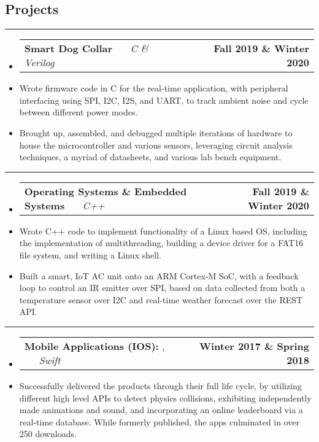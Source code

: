 \documentclass[10pt,letterpaper]{article}
\makeatletter
\newcommand{\header}[2]
{
	\begin{tabular*}{\linewidth}{l @{\extracolsep{\fill}} r}
		\hspace{-27pt} #1 & #2 \\
	\end{tabular*}
}
\newcommand{\sectionbreak}
{
	\vspace{-1.2em}
	\rule{\textwidth}{1.7pt}
	\vspace{-1.7em}
}
\makeatother
\begin{document}
\vspace{-1.5em}

\subsection*{Projects}
\sectionbreak


\begin{itemize}
	\item[]
		\header
		{
			\textbf{Smart Dog Collar}
			\emph{\smash{Senior Design Project}} \ \ \ \footnotesize \emph{C \& Verilog}
		}
		{\textbf{Fall 2019 \& Winter 2020}}
	\item 
		Wrote firmware code in C for the real-time application, with peripheral interfacing using SPI, I2C, I2S, and UART, to track ambient noise and cycle between different power modes.
	\item 
		Brought up, assembled, and debugged multiple iterations of hardware to house the microcontroller and various sensors, leveraging circuit analysis techniques, a myriad of datasheets, and various lab bench equipment.

\end{itemize}

\hrule

\begin{itemize}
	\item[]
		\header
		{
			\textbf{Operating Systems \& Embedded Systems}
			\emph{\smash{Relevant Course Project}} \ \ \ \footnotesize \emph{C++}
		}
		{\textbf{Fall 2019 \& Winter 2020}}
	\item 
		Wrote C++ code to implement functionality of a Linux based OS, including the implementation of multithreading, building a device driver for a FAT16 file system, and writing a Linux shell.
	\item 
		Built a smart, IoT AC unit onto an ARM Cortex-M SoC, with a feedback loop to control an IR emitter over SPI, based on data collected from both a temperature sensor over I2C and real-time weather forecast over the REST API. 

\end{itemize}

\hrule

\begin{itemize}
	\item[]
		\header
		{
			\textbf{Mobile Applications (IOS): }
			\href{https://appadvice.com/app/round-bound/1369632746}{\emph{\underline{\smash{Round 'a Bound}}}}, 
			\href{https://appadvice.com/app/tic-tac-emoji/1346934986}{\emph{\underline{\smash{Tic-Tac Emoji}}}} \ \ \ \footnotesize  \emph{Swift}
		}
		{\textbf{Winter 2017 \& Spring 2018}}
	\item 
		Successfully delivered the products through their full life cycle, by utilizing different high level APIs to detect physics collisions, exhibiting independently made animations and sound, and incorporating an online leaderboard via a real-time database. While formerly published, the apps culminated in over 250 downloads.
\end{itemize}


																																																																																																																																																																																																
\end{document}
